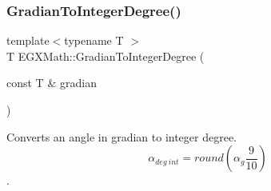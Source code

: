 \mbox{\label{group___e_g_x_math-_conversions-_angle_conversions-_gradian_ga555aae885f8a7d0876a36aa07cbbd816}} 
\subsubsection{\texorpdfstring{Gradian\+To\+Integer\+Degree()}{GradianToIntegerDegree()}}
{\footnotesize\ttfamily template$<$typename T $>$ \\
T E\+G\+X\+Math\+::\+Gradian\+To\+Integer\+Degree (\begin{DoxyParamCaption}\item[{const T \&}]{gradian }\end{DoxyParamCaption})}



Converts an angle in gradian to integer degree. \[\alpha_{deg\ int}=round(\alpha_{g}\frac{9}{10})\]. 

